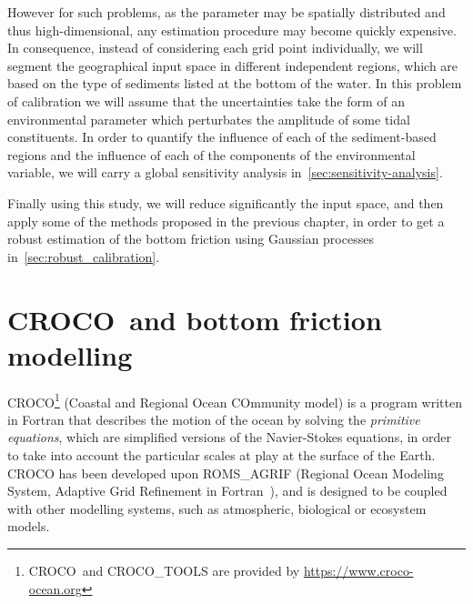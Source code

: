 \documentclass[../../Main_ManuscritThese.tex]{subfiles}
\newcommand{\CROCO}{CROCO}
\begin{document}
However for such problems, as the parameter may be spatially
distributed and thus high-dimensional, any estimation procedure may
become quickly expensive.  In consequence, instead of considering each
grid point individually, we will segment the geographical input space
in different independent regions, which are based on the type of
sediments listed at the bottom of the water. In this problem of
calibration we will assume that the uncertainties take the form of an
environmental parameter which perturbates the amplitude of some tidal
constituents.  In order to quantify the influence of each of the
sediment-based regions and the influence of each of the components of
the environmental variable, we will carry a global sensitivity
analysis in~\cref{sec:sensitivity-analysis}.

Finally using this study, we will reduce significantly the input
space, and then apply some of the methods proposed in the previous
chapter, in order to get a robust estimation of the bottom friction
using Gaussian processes in~\cref{sec:robust_calibration}.


\section{\CROCO\ and bottom friction modelling}
\label{sec:croco_bottom_fr}
\CROCO{}\footnote{\CROCO\ and CROCO\_TOOLS are provided by
  \url{https://www.croco-ocean.org}} (Coastal and Regional Ocean
COmmunity model) is a program written in Fortran that describes the
motion of the ocean by solving the \emph{primitive equations}, which
are simplified versions of the Navier-Stokes equations, in order to
take into account the particular scales at play at the surface of the
Earth. \CROCO{} has been developed upon
ROMS\_AGRIF %
(Regional Ocean Modeling System, Adaptive Grid Refinement in
Fortran~\cite{debreu_two-way_2012}), and is designed to be coupled with
other modelling systems, such as atmospheric, biological or ecosystem
models.

\end{document}
